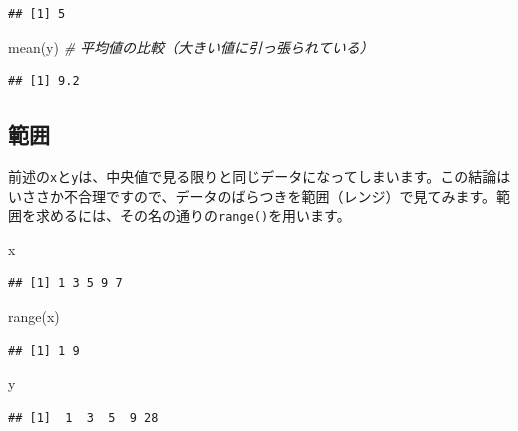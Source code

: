 \documentclass[
  12pt,
]{book}
\newenvironment{Shaded}{\begin{snugshade}}{\end{snugshade}}
\newcommand{\CommentTok}[1]{\textcolor[rgb]{0.56,0.35,0.01}{\textit{#1}}}
\newcommand{\FunctionTok}[1]{\textcolor[rgb]{0.00,0.00,0.00}{#1}}
\newcommand{\NormalTok}[1]{#1}
\begin{document}
\begin{verbatim}
## [1] 5
\end{verbatim}

\begin{Shaded}
\begin{Highlighting}[numbers=left,,]
\FunctionTok{mean}\NormalTok{(y)                      }\CommentTok{\# 平均値の比較（大きい値に引っ張られている）}
\end{Highlighting}
\end{Shaded}

\begin{verbatim}
## [1] 9.2
\end{verbatim}

\hypertarget{ux7bc4ux56f2}{%
\subsection{範囲}\label{ux7bc4ux56f2}}

前述の\texttt{x}と\texttt{y}は、中央値で見る限りと同じデータになってしまいます。この結論はいささか不合理ですので、データのばらつきを範囲（レンジ）で見てみます。範囲を求めるには、その名の通りの\texttt{range()}を用います。

\begin{Shaded}
\begin{Highlighting}[numbers=left,,]
\NormalTok{x}
\end{Highlighting}
\end{Shaded}

\begin{verbatim}
## [1] 1 3 5 9 7
\end{verbatim}

\begin{Shaded}
\begin{Highlighting}[numbers=left,,]
\FunctionTok{range}\NormalTok{(x)}
\end{Highlighting}
\end{Shaded}

\begin{verbatim}
## [1] 1 9
\end{verbatim}

\begin{Shaded}
\begin{Highlighting}[numbers=left,,]
\NormalTok{y}
\end{Highlighting}
\end{Shaded}

\begin{verbatim}
## [1]  1  3  5  9 28
\end{verbatim}
\end{document}
